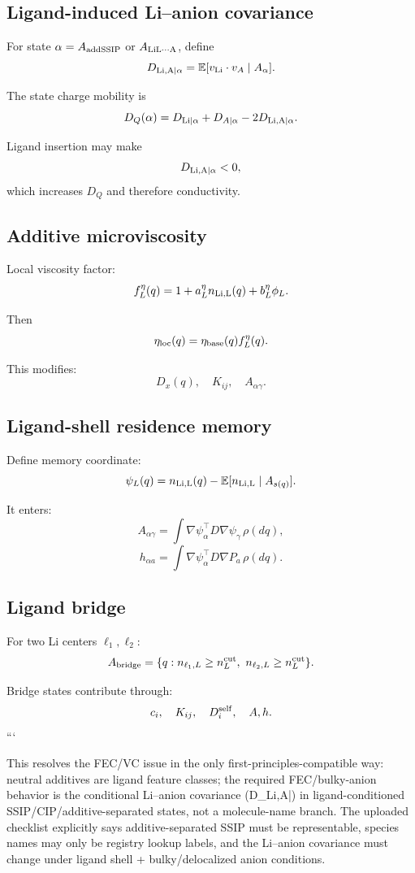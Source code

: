 \subsection{Ligand-induced Li--anion covariance}

For state \(\alpha=A_{\rm addSSIP}\) or \(A_{\rm LiL\cdots A}\), define
\[
D_{\rm Li,A|\alpha}
=
\mathbb E[
v_{\rm Li}\cdot v_A
\mid A_\alpha
].
\]

The state charge mobility is
\[
D_Q(\alpha)
=
D_{\rm Li|\alpha}
+
D_{A|\alpha}
-
2D_{\rm Li,A|\alpha}.
\]

Ligand insertion may make
\[
D_{\rm Li,A|\alpha}<0,
\]
which increases \(D_Q\) and therefore conductivity.

\subsection{Additive microviscosity}

Local viscosity factor:
\[
f_L^\eta(q)
=
1+a_L^\eta n_{\rm Li,L}(q)+b_L^\eta \phi_L.
\]

Then
\[
\eta_{\rm loc}(q)=\eta_{\rm base}(q)f_L^\eta(q).
\]

This modifies:
\[
D_x(q),
\quad
K_{ij},
\quad
A_{\alpha\gamma}.
\]

\subsection{Ligand-shell residence memory}

Define memory coordinate:
\[
\psi_L(q)=n_{\rm Li,L}(q)-\mathbb E[n_{\rm Li,L}\mid A_{s(q)}].
\]

It enters:
\[
A_{\alpha\gamma}
=
\int
\nabla\psi_\alpha^\top D\nabla\psi_\gamma\,\rho(dq),
\]
\[
h_{\alpha a}
=
\int
\nabla\psi_\alpha^\top D\nabla P_a\,\rho(dq).
\]

\subsection{Ligand bridge}

For two Li centers \(\ell_1,\ell_2\):
\[
A_{\rm bridge}
=
\{q:n_{\ell_1,L}\ge n_L^{\rm cut},\ n_{\ell_2,L}\ge n_L^{\rm cut}\}.
\]

Bridge states contribute through:
\[
c_i,\quad K_{ij},\quad D_i^{\rm self},\quad A,h.
\]
```

This resolves the FEC/VC issue in the only first-principles-compatible way: neutral additives are ligand feature classes; the required FEC/bulky-anion behavior is the conditional Li–anion covariance (D_{\rm Li,A|\alpha}) in ligand-conditioned SSIP/CIP/additive-separated states, not a molecule-name branch. The uploaded checklist explicitly says additive-separated SSIP must be representable, species names may only be registry lookup labels, and the Li–anion covariance must change under ligand shell + bulky/delocalized anion conditions. 

